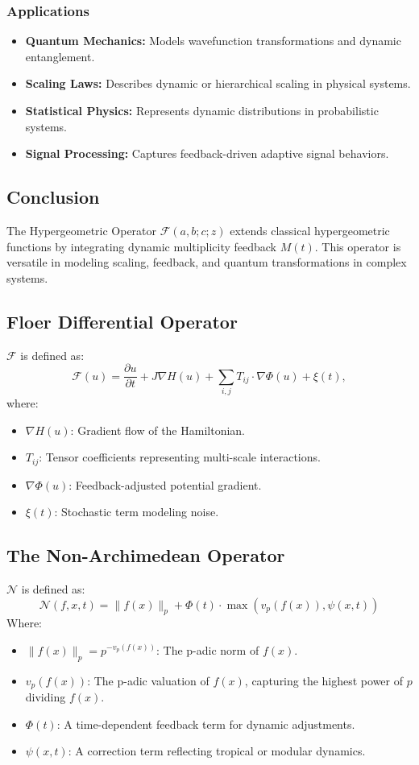 \documentclass{article}
\theoremstyle{plain}
\begin{document}
\subsubsection*{Applications}
\begin{itemize}
    \item \textbf{Quantum Mechanics:} Models wavefunction transformations and dynamic entanglement.
    \item \textbf{Scaling Laws:} Describes dynamic or hierarchical scaling in physical systems.
    \item \textbf{Statistical Physics:} Represents dynamic distributions in probabilistic systems.
    \item \textbf{Signal Processing:} Captures feedback-driven adaptive signal behaviors.
\end{itemize}

\subsection*{Conclusion}
The Hypergeometric Operator \( \mathcal{F}(a, b; c; z) \) extends classical hypergeometric functions by integrating dynamic multiplicity feedback \( M(t) \). This operator is versatile in modeling scaling, feedback, and quantum transformations in complex systems.

\subsection{Floer Differential Operator}
$\mathcal{F}$ is defined as:
\begin{equation}
    \mathcal{F}(u) = \frac{\partial u}{\partial t} + J \nabla H(u) + \sum_{i,j} T_{ij} \cdot \nabla \Phi(u) + \xi(t),
\end{equation}
where:
\begin{itemize}
    \item $\nabla H(u)$: Gradient flow of the Hamiltonian.
    \item $T_{ij}$: Tensor coefficients representing multi-scale interactions.
    \item $\nabla \Phi(u)$: Feedback-adjusted potential gradient.
    \item $\xi(t)$: Stochastic term modeling noise.
\end{itemize}
\subsection{The Non-Archimedean Operator} \( \mathcal{N} \) is defined as:
\[
\mathcal{N}(f, x, t) = \| f(x) \|_p + \Phi(t) \cdot \max\left( v_p(f(x)), \psi(x, t) \right)
\]
Where:
\begin{itemize}
    \item \( \| f(x) \|_p = p^{-v_p(f(x))} \): The p-adic norm of \( f(x) \).
    \item \( v_p(f(x)) \): The p-adic valuation of \( f(x) \), capturing the highest power of \( p \) dividing \( f(x) \).
    \item \( \Phi(t) \): A time-dependent feedback term for dynamic adjustments.
    \item \( \psi(x, t) \): A correction term reflecting tropical or modular dynamics.
\end{itemize}
\end{document}
